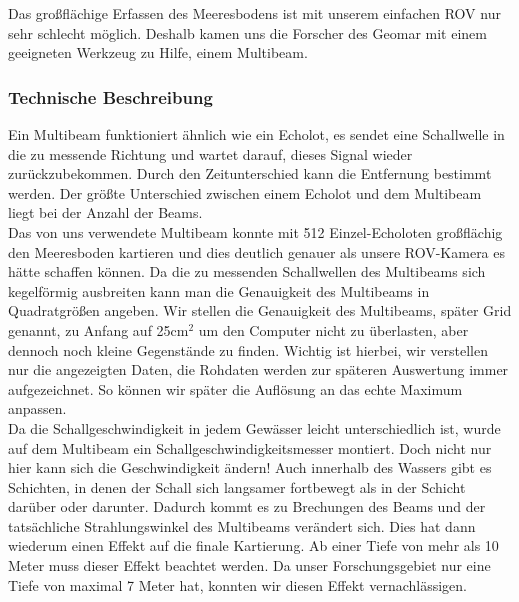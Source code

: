  

Das großflächige Erfassen des Meeresbodens ist mit unserem einfachen ROV nur sehr schlecht möglich. Deshalb kamen uns die Forscher des Geomar mit einem geeigneten Werkzeug zu Hilfe, einem \glqq Multibeam\grqq . \\

\subsubsection{Technische Beschreibung}
Ein Multibeam funktioniert ähnlich wie ein Echolot, es sendet eine Schallwelle in die zu messende 
Richtung und wartet darauf, dieses Signal wieder zurückzubekommen. Durch den Zeitunterschied 
kann die Entfernung bestimmt werden. Der größte Unterschied zwischen einem Echolot und dem Multibeam 
liegt bei der Anzahl der Beams. \\

Das von uns verwendete Multibeam konnte mit 512 Einzel-Echoloten großflächig den Meeresboden kartieren und dies 
deutlich genauer als unsere ROV-Kamera es hätte schaffen können. Da die zu messenden Schallwellen des Multibeams 
sich kegelförmig ausbreiten kann man die Genauigkeit des Multibeams in Quadratgrößen angeben. 
Wir stellen die Genauigkeit des Multibeams, später Grid genannt, zu Anfang auf 25cm$^2$ um den Computer nicht zu überlasten, aber 
dennoch noch kleine Gegenstände zu finden. Wichtig ist hierbei, wir verstellen nur die angezeigten Daten, die Rohdaten werden zur späteren Auswertung immer aufgezeichnet. 
So können wir später die Auflösung an das echte Maximum anpassen.\\

Da die Schallgeschwindigkeit in jedem Gewässer leicht unterschiedlich ist, wurde auf dem Multibeam
ein Schallgeschwindigkeitsmesser montiert. Doch nicht nur hier kann sich die Geschwindigkeit ändern!
Auch innerhalb des Wassers gibt es Schichten, in denen der Schall sich langsamer fortbewegt als in
der Schicht darüber oder darunter. Dadurch kommt es zu Brechungen des Beams und der tatsächliche 
Strahlungswinkel des Multibeams verändert sich. Dies hat dann wiederum einen Effekt auf die finale Kartierung.
Ab einer Tiefe von mehr als 10 Meter muss dieser Effekt beachtet werden. Da unser Forschungsgebiet nur eine 
Tiefe von maximal 7 Meter hat, konnten wir diesen Effekt vernachlässigen.\\

